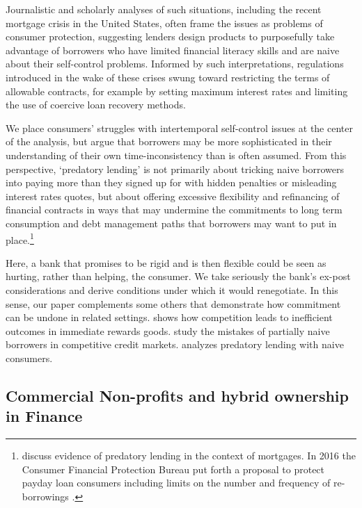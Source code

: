 \documentclass[11pt,english]{article}
\theoremstyle{plain}
\theoremstyle{definition}
\begin{document}
Journalistic and scholarly analyses of such situations, including
the recent mortgage crisis in the United States, often frame
the issues as problems of consumer protection, suggesting lenders design products to purposefully take advantage of borrowers
who have limited financial literacy skills and are naive about their
self-control problems. Informed by such interpretations, regulations
introduced in the wake of these crises swung toward restricting
the terms of allowable contracts, for example by setting maximum interest
rates and limiting the use of coercive loan recovery methods.

We place consumers' struggles with intertemporal self-control issues
at the center of the analysis, but argue that borrowers may be more
sophisticated in their understanding of their own time-inconsistency
than is often assumed. From this perspective, `predatory lending'
is not primarily about tricking naive borrowers into paying more than
they signed up for with hidden penalties or misleading interest rates
quotes, but about offering excessive flexibility and refinancing of
financial contracts in ways that may undermine the commitments
to long term consumption and debt management paths that borrowers
may want to put in place.\footnote{\citet{bond2009} discuss evidence of predatory lending in the context
of mortgages. In 2016 the Consumer Financial Protection Bureau put
forth a proposal to protect payday loan consumers including limits
on the number and frequency of re-borrowings \citep{cfpb2016}.}

Here, a bank that promises to be rigid and is then flexible could
be seen as hurting, rather than helping, the consumer. We take seriously
the bank's ex-post considerations and derive conditions under which
it would renegotiate.
In this sense, our paper complements some others that demonstrate
how commitment can be undone in related settings. \citet{gottlieb2008}
shows how competition leads to inefficient outcomes in immediate rewards
goods. \citet{heidhues2010} study the mistakes of partially naive
borrowers in competitive credit markets. \citet{mendez2012} analyzes
predatory lending with naive consumers. 

\subsection{Commercial Non-profits and hybrid ownership in Finance}
\end{document}
